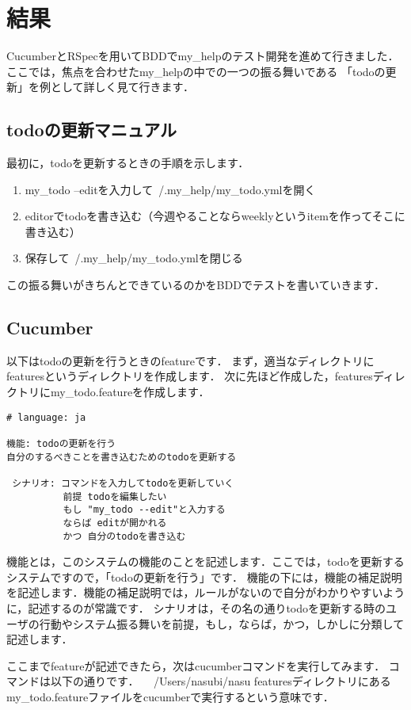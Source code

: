 
\section{結果}
CucumberとRSpecを用いてBDDでmy\_helpのテスト開発を進めて行きました．
ここでは，焦点を合わせたmy\_helpの中での一つの振る舞いである
「todoの更新」を例として詳しく見て行きます．

\subsection{todoの更新マニュアル}
最初に，todoを更新するときの手順を示します．

\begin{enumerate}
\item my\_todo --editを入力して~/.my\_help/my\_todo.ymlを開く
\item editorでtodoを書き込む（今週やることならweeklyというitemを作ってそこに書き込む）
\item 保存して~/.my\_help/my\_todo.ymlを閉じる
\end{enumerate}
この振る舞いがきちんとできているのかをBDDでテストを書いていきます．

\subsection{Cucumber}
以下はtodoの更新を行うときのfeatureです．
まず，適当なディレクトリにfeaturesというディレクトリを作成します．
次に先ほど作成した，featuresディレクトリにmy\_todo.featureを作成します．
\begin{lstlisting}[style=customCsh,basicstyle={\scriptsize\ttfamily}]
# language: ja 

機能: todoの更新を行う
自分のするべきことを書き込むためのtodoを更新する

 シナリオ: コマンドを入力してtodoを更新していく
          前提 todoを編集したい
          もし "my_todo --edit"と入力する
          ならば editが開かれる
          かつ 自分のtodoを書き込む
\end{lstlisting}
機能とは，このシステムの機能のことを記述します．ここでは，todoを更新するシステムですので，「todoの更新を行う」です．
機能の下には，機能の補足説明を記述します．機能の補足説明では，ルールがないので自分がわかりやすいように，記述するのが常識です．
シナリオは，その名の通りtodoを更新する時のユーザの行動やシステム振る舞いを前提，もし，ならば，かつ，しかしに分類して記述します．

ここまでfeatureが記述できたら，次はcucumberコマンドを実行してみます．
コマンドは以下の通りです．
　/Users/nasubi/nasu%
featuresディレクトリにあるmy\_todo.featureファイルをcucumberで実行するという意味です．

